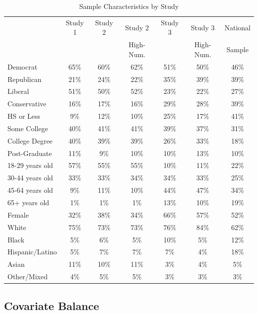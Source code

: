 \documentclass[12pt, letterpaper]{article}
\begin{document}
\singlespacing
\begin{table}[h]
\centering
\caption{Sample Characteristics by Study} \label{tab:sample}
\begin{tabular}{| l c c c c c c |}
\hline 
			& Study 1	& Study 2	& Study 2	& Study 3	& Study 3	& National	\\
			& 		& 		& High-Num. & 		& High-Num. & Sample	\\ \hline
Democrat		& 65\%	& 60\% 	& 62\%	& 51\%	&50\%	& 46\%	\\ 
Republican	& 21\%	& 24\% 	& 22\%	& 35\%	&39\%	& 39\%	\\ \hline
Liberal		& 51\%	& 50\% 	& 52\%	& 23\%	&22\%	& 27\%	\\ 
Conservative	& 16\%	& 17\% 	& 16\%	& 29\%	&28\%	& 39\% 	\\ \hline
HS or Less	& 9\%	& 12\% 	& 10\%	& 25\%	&17\%	& 41\% 	\\ 
Some College	& 40\%	& 41\% 	& 41\%	& 39\%	&37\%	& 31\% 	\\ 
College Degree	& 40\%	& 39\% 	& 39\%	& 26\%	&33\%	& 18\% 	\\ 
Post-Graduate	& 11\%	& 9\% 	& 10\%	& 10\%	&13\%	& 10\% 	\\ \hline
18-29 years old	& 57\%	& 55\% 	& 55\%	& 10\%	&11\%	& 22\% 	\\ 
30-44 years old	& 33\%	& 33\% 	& 34\%	& 34\%	&33\%	& 25\% 	\\ 
45-64 years old	& 9\%	& 11\% 	& 10\%	& 44\%	&47\%	& 34\% 	\\ 
65+ years old	& 1\%	& 1\% 	& 1\%	& 13\%	&10\%	& 19\% 	\\ \hline
Female		& 32\%	& 38\% 	& 34\%	& 66\%	&57\%	& 52\% 	\\ \hline
White		& 75\%	& 73\% 	& 73\%	& 76\%	&84\%	& 62\% 	\\ 
Black		& 5\%	& 6\% 	& 5\%	& 10\%	&5\%		& 12\% 	\\ 
Hispanic/Latino	& 5\%	& 7\% 	& 7\%	& 7\%	&4\%		& 18\% 	\\ 
Asian		& 11\%	& 10\% 	& 11\%	& 3\%	&4\%		& 5\% 	\\ 
Other/Mixed	& 4\%	& 5\% 	& 5\%	& 3\%	&3\%		& 3\% 	\\ \hline
\end{tabular}
\end{table}
\doublespacing

\clearpage
\subsection{Covariate Balance}
\label{sec:balance}
\end{document}
